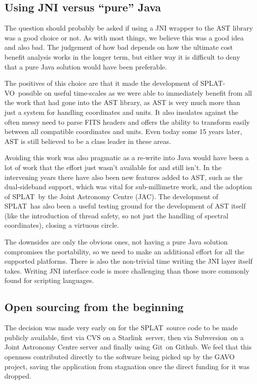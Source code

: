 \documentclass[final,authoryear,5p,times,twocolumn]{elsarticle}
\newcommand{\splat}{\textsf{\small SPLAT}}
\newcommand{\splatvo}{{\textsf{\small{SPLAT-VO}}}}
\newcommand{\Starlink}{\textsf{\small Starlink}}
\newcommand{\subversion}{\textsf{\small Subversion}}
\newcommand{\git}{\textsf{\small Git}}
\begin{document}
\subsection{Using JNI versus ``pure'' Java}
\label{sec:jniast-lesson}

The question should probably be asked if using a JNI wrapper to the
AST library was a good choice or not. As with most things, we believe
this was a good idea and also bad. The judgement of how bad depends on
how the ultimate cost benefit analysis works in the longer term, but
either way it is difficult to deny that a pure Java solution would
have been preferable.

The positives of this choice are that it made the development of
\splatvo\ possible on useful time-scales as we were able to immediately
benefit from all the work that had gone into the AST library, as AST
is very much more than just a system for handling coordinates and
units. It also insulates against the often messy need to parse FITS
headers and offers the ability to transform easily between all
compatible coordinates and units. Even today some 15 years later, AST
is still believed to be a class leader in these areas.

Avoiding this work was also pragmatic as a re-write into Java would
have been a lot of work that the effort just wasn't available for and
still isn't. In the intervening years there have also been new
features added to AST, such as the dual-sideband support, which was
vital for sub-millimetre work, and the adoption of \splat\ by the
Joint Astronomy Centre (JAC). The development of \splat\ has also been a useful testing ground
for the development of AST itself (like the introduction of thread
safety, so not just the handling of spectral coordinates), closing a
virtuous circle.

The downsides are only the obvious ones, not having a pure Java
solution compromises the portability, so we need to make an additional
effort for all the supported platforms. There is also the non-trivial
time writing the JNI layer itself takes. Writing JNI interface code is
more challenging than those more commonly found for scripting
languages.

\subsection{Open sourcing from the beginning}

The decision was made very early on for the \splat\ source code to be
made publicly available, first via CVS on a \Starlink\ server, then via
\subversion\ on a Joint Astronomy Centre server and finally using \git\ 
on Github. We feel that this openness contributed directly to the
software being picked up by the GAVO project, saving the application
from stagnation once the direct funding for it was dropped.
\end{document}
